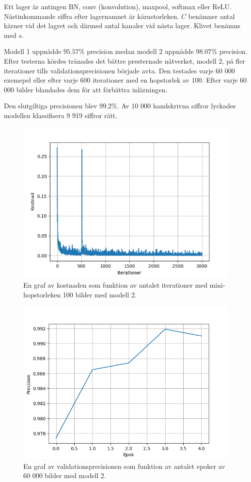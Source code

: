 \documentclass[a4paper,11pt,twoside]{article}
\begin{document}
Ett lager är antingen BN, conv (konvolution), maxpool, softmax eller ReLU. Nästinkommande siffra efter lagernamnet är kärnstorleken. $C$ benämner antal kärner vid det lagret och därmed antal kanaler vid nästa lager. Klivet benämns med $s$.

Modell 1 uppnådde $95.57\%$ precision medan modell 2 uppnådde $98.07\%$ precision. Efter testerna kördes tränades det bättre presternade nätverket, modell 2, på fler iterationer tills validationsprecisionen började avta. Den testades varje 60 000 exemepel eller efter varje 600 iterationer med en hopstorlek av 100. Efter varje 60 000 bilder blandades dem för att förbättra inlärningen.

Den slutgiltiga precisionen blev $99.2\%$. Av 10 000 handskrivna siffror lyckades modellen klassifisera 9 919 siffror rätt.

\begin{figure}[h]\label{figkosnadmnist}
	\centering
  		\includegraphics[scale=0.6]{kostandsplot.png}
  	\caption{En graf av kostnaden som funktion av antalet iterationer med mini-hopstorleken 100 bilder med modell 2.}
\end{figure}
\quad

\quad
\begin{figure}[h]\label{figepokmnist}
	\centering
  		\includegraphics[scale=0.6]{epokplot.png}
  	\caption{En graf av validationsprecisionen som funktion av antalet epoker av 60 000 bilder med modell 2.}
\end{figure}
\end{document}
